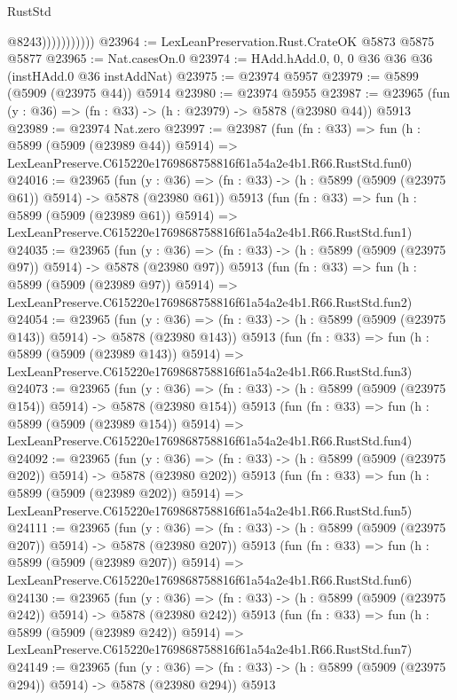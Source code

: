 \begin{lexlean}{RustStd}
\begin{coremodule}
{{                          @8243)))))))))))
@23964 := LexLeanPreservation.Rust.CrateOK @5873 @5875 @5877
@23965 := Nat.casesOn.{0}
@23974 := HAdd.hAdd.{0, 0, 0} @36 @36 @36 (instHAdd.{0} @36 instAddNat)
@23975 := @23974 @5957
@23979 := @5899 (@5909 (@23975 @44)) @5914
@23980 := @23974 @5955
@23987 := @23965 (fun (y : @36) => (fn : @33) -> (h : @23979) -> @5878 (@23980 @44)) @5913
@23989 := @23974 Nat.zero
@23997 := @23987
    (fun (fn : @33) =>
    fun (h : @5899 (@5909 (@23989 @44)) @5914) =>
    LexLeanPreserve.C615220e1769868758816f61a54a2e4b1.R66.RustStd.fun0)
@24016 := @23965
    (fun (y : @36) => (fn : @33) -> (h : @5899 (@5909 (@23975 @61)) @5914) -> @5878 (@23980 @61))
    @5913
    (fun (fn : @33) =>
    fun (h : @5899 (@5909 (@23989 @61)) @5914) =>
    LexLeanPreserve.C615220e1769868758816f61a54a2e4b1.R66.RustStd.fun1)
@24035 := @23965
    (fun (y : @36) => (fn : @33) -> (h : @5899 (@5909 (@23975 @97)) @5914) -> @5878 (@23980 @97))
    @5913
    (fun (fn : @33) =>
    fun (h : @5899 (@5909 (@23989 @97)) @5914) =>
    LexLeanPreserve.C615220e1769868758816f61a54a2e4b1.R66.RustStd.fun2)
@24054 := @23965
    (fun (y : @36) => (fn : @33) -> (h : @5899 (@5909 (@23975 @143)) @5914) -> @5878 (@23980 @143))
    @5913
    (fun (fn : @33) =>
    fun (h : @5899 (@5909 (@23989 @143)) @5914) =>
    LexLeanPreserve.C615220e1769868758816f61a54a2e4b1.R66.RustStd.fun3)
@24073 := @23965
    (fun (y : @36) => (fn : @33) -> (h : @5899 (@5909 (@23975 @154)) @5914) -> @5878 (@23980 @154))
    @5913
    (fun (fn : @33) =>
    fun (h : @5899 (@5909 (@23989 @154)) @5914) =>
    LexLeanPreserve.C615220e1769868758816f61a54a2e4b1.R66.RustStd.fun4)
@24092 := @23965
    (fun (y : @36) => (fn : @33) -> (h : @5899 (@5909 (@23975 @202)) @5914) -> @5878 (@23980 @202))
    @5913
    (fun (fn : @33) =>
    fun (h : @5899 (@5909 (@23989 @202)) @5914) =>
    LexLeanPreserve.C615220e1769868758816f61a54a2e4b1.R66.RustStd.fun5)
@24111 := @23965
    (fun (y : @36) => (fn : @33) -> (h : @5899 (@5909 (@23975 @207)) @5914) -> @5878 (@23980 @207))
    @5913
    (fun (fn : @33) =>
    fun (h : @5899 (@5909 (@23989 @207)) @5914) =>
    LexLeanPreserve.C615220e1769868758816f61a54a2e4b1.R66.RustStd.fun6)
@24130 := @23965
    (fun (y : @36) => (fn : @33) -> (h : @5899 (@5909 (@23975 @242)) @5914) -> @5878 (@23980 @242))
    @5913
    (fun (fn : @33) =>
    fun (h : @5899 (@5909 (@23989 @242)) @5914) =>
    LexLeanPreserve.C615220e1769868758816f61a54a2e4b1.R66.RustStd.fun7)
@24149 := @23965
    (fun (y : @36) => (fn : @33) -> (h : @5899 (@5909 (@23975 @294)) @5914) -> @5878 (@23980 @294))
    @5913
}}
\end{coremodule}
\end{lexlean}
